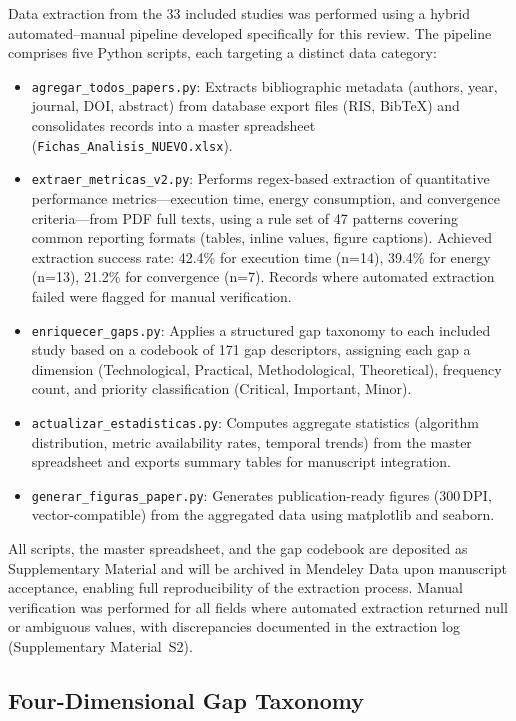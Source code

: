 \documentclass[review,3p,times]{elsarticle}
\begin{document}
Data extraction from the 33 included studies was performed using a hybrid automated--manual pipeline developed specifically for this review. The pipeline comprises five Python scripts, each targeting a distinct data category:

\begin{itemize}
  \item \texttt{agregar\_todos\_papers.py}: Extracts bibliographic metadata (authors, year, journal, DOI, abstract) from database export files (RIS, BibTeX) and consolidates records into a master spreadsheet (\texttt{Fichas\_Analisis\_NUEVO.xlsx}).
  \item \texttt{extraer\_metricas\_v2.py}: Performs regex-based extraction of quantitative performance metrics---execution time, energy consumption, and convergence criteria---from PDF full texts, using a rule set of 47 patterns covering common reporting formats (tables, inline values, figure captions). Achieved extraction success rate: 42.4\% for execution time (n=14), 39.4\% for energy (n=13), 21.2\% for convergence (n=7). Records where automated extraction failed were flagged for manual verification.
  \item \texttt{enriquecer\_gaps.py}: Applies a structured gap taxonomy to each included study based on a codebook of 171 gap descriptors, assigning each gap a dimension (Technological, Practical, Methodological, Theoretical), frequency count, and priority classification (Critical, Important, Minor).
  \item \texttt{actualizar\_estadisticas.py}: Computes aggregate statistics (algorithm distribution, metric availability rates, temporal trends) from the master spreadsheet and exports summary tables for manuscript integration.
  \item \texttt{generar\_figuras\_paper.py}: Generates publication-ready figures (300\,DPI, vector-compatible) from the aggregated data using matplotlib and seaborn.
\end{itemize}

All scripts, the master spreadsheet, and the gap codebook are deposited as Supplementary Material and will be archived in Mendeley Data upon manuscript acceptance, enabling full reproducibility of the extraction process. Manual verification was performed for all fields where automated extraction returned null or ambiguous values, with discrepancies documented in the extraction log (Supplementary Material~S2).

\subsection{Four-Dimensional Gap Taxonomy}
\end{document}
